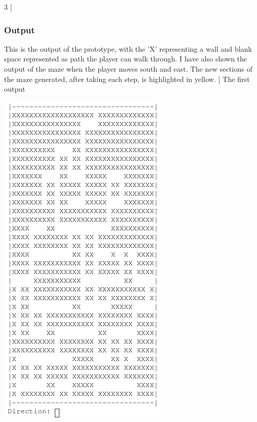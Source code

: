 \documentclass{article}
\begin{document}
            \clearpage
            \begin{multicols*}{3}
                [
                    \subsubsection{Output}
                    This is the output of the prototype, with the 'X' representing a wall and blank space represented as path the player can walk through. I have also shown the output of the maze when the player moves south and east. The new sections of the maze generated, after taking each step, is highlighted in yellow.
                ]
                The first output \par
                \centerline{\includegraphics[width=0.8\linewidth]{img/Design/Output1.png}}


\end{multicols*}
\end{document}
